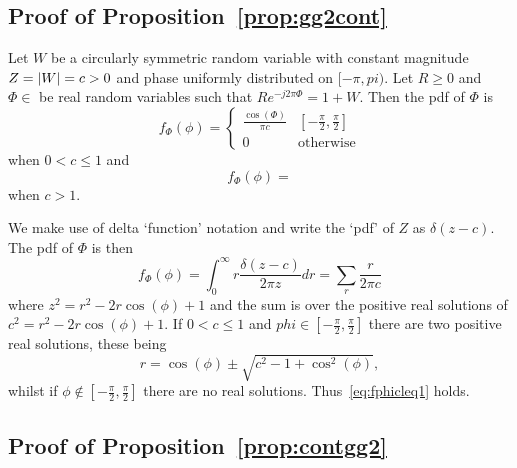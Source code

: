 \documentclass[journal]{IEEEtran}
\begin{document}
\subsection{Proof of Proposition~\ref{prop:gg2cont}} \label{appendix:prop1proof}

\begin{lemma}
Let $W$ be a circularly symmetric random variable with constant magnitude $Z = {\left\vert W \right\vert} = c > 0$ and phase uniformly distributed on $[-\pi,pi)$.  Let $R \geq 0$ and $\Phi \in $ be real random variables such that $Re^{-j2\pi \Phi} = 1 + W$.  Then the pdf of $\Phi$ is
\begin{equation} \label{eq:fphicleq1}
f_{\Phi}(\phi) = \begin{cases} 
\frac{\cos(\Phi)}{\pi c} &  [-\tfrac{\pi}{2}, \tfrac{\pi}{2}] \\
0 & \text{otherwise}
\end{cases}
\end{equation}
when $0 < c \leq 1$ and
\begin{equation} \label{eq:fphicg1}
f_{\Phi}(\phi) = 
\end{equation}
when $c > 1$.
\end{lemma}
\begin{IEEEproof}
We make use of delta `function' notation and write the `pdf' of $Z$ as $\delta(z - c)$.  The pdf of $\Phi$ is then
\[
f_{\Phi}(\phi) = \int_{0}^{\infty} r \frac{\delta(z - c)}{ 2\pi z} dr = \sum_{r} \frac{r}{2\pi c}
\]
where $z^2 = r^2 - 2r\cos(\phi) + 1$ and the sum is over the positive real solutions of $c^2 = r^2 - 2r\cos(\phi) + 1$.  If $0 < c \leq 1$ and $phi \in [-\tfrac{\pi}{2}, \tfrac{\pi}{2}]$ there are two positive real solutions, these being
\[
r = \cos(\phi) \pm \sqrt{c^2 - 1 + \cos^2(\phi)},
\]
whilst if $\phi \notin [-\tfrac{\pi}{2}, \tfrac{\pi}{2}]$ there are no real solutions.  Thus~\eqref{eq:fphicleq1} holds.
\end{IEEEproof}


\subsection{Proof of Proposition~\ref{prop:contgg2}} \label{appendix:prop2proof}


 
\end{document}
